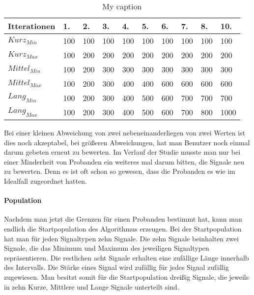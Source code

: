 \begin{table}[]
\centering
\caption{My caption}
\label{my-label}
\begin{tabular}{|l|l|l|l|l|l|l|l|l|l|}
\hline
Itterationen            & 1. & 2. & 3. & 4. & 5. & 6. & 7. & 8. & 10. \\ \hline
$Kurz_{Min}$   & 100          & 100          & 100          & 100          & 100          & 100          & 100          & 100          & 100           \\ \hline
$Kurz_{Max}$   & 100          & 200          & 200          & 200          & 200          & 200          & 200          & 200          & 200           \\ \hline
$Mittel_{Min}$ & 100          & 200          & 300          & 300          & 300          & 300          & 300          & 300          & 300           \\ \hline
$Mittel_{Max}$ & 100          & 200          & 300          & 400          & 400          & 600          & 600          & 600          & 600           \\ \hline
$Lang_{Min}$   & 100          & 200          & 300          & 400          & 500          & 600          & 700          & 700          & 700           \\ \hline
$Lang_{Max}$   & 100          & 200          & 300          & 400          & 500          & 600          & 700          & 800          & 1000          \\ \hline
\end{tabular}
\end{table}

Bei einer kleinen Abweichung von zwei nebeneinanderliegen von zwei Werten ist dies noch akzeptabel, bei gr{\"o}{\ss}eren Abweichungen, hat man Benutzer noch einmal darum gebeten erneut zu bewerten. Im Verlauf der Studie musste man nur bei einer Minderheit von Probanden ein weiteres mal darum bitten, die Signale neu zu bewerten. Denn es ist oft schon so gewesen, dass die Probanden es wie im Idealfall zugeordnet hatten.

\paragraph{Population}

Nachdem man jetzt die Grenzen f{\"u}r einen Probanden bestimmt hat, kann man endlich die Startpopulation des Algorithmus erzeugen. 
Bei der Startpopulation hat man f{\"u}r jeden Signaltypen zehn Signale. 
Die zehn Signale beinhalten zwei Signale, die das Minimum und Maximum des jeweiligen Signaltypen repr{\"a}sentieren. Die restlichen acht Signale erhalten eine zuf{\"a}llige L{\"a}nge innerhalb des Intervalls. Die St{\"a}rke eines Signal wird zuf{\"a}llig f{\"u}r jedes Signal zuf{\"a}llig zugewiesen. 
Man besitzt somit f{\"u}r die Startpopulation drei{\ss}ig Signale, die jeweils in zehn Kurze, Mittlere und Lange Signale unterteilt sind. 


